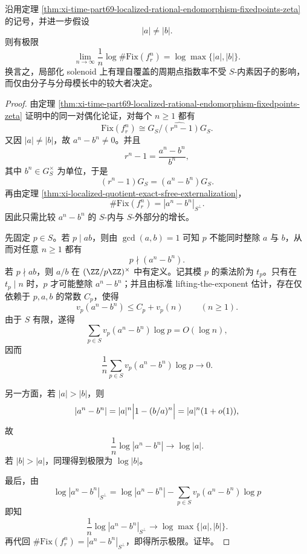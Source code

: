 \begin{theorem}[局部化有理自覆盖的周期点指数率只由分子分母的最大模控制]\label{thm:xi-time-part69-localized-rational-endomorphism-growth-rate}
沿用定理 \ref{thm:xi-time-part69-localized-rational-endomorphism-fixedpoints-zeta} 的记号，并进一步假设
\[
|a|\neq |b|.
\]
则有极限
\[
\lim_{n\to\infty}\frac{1}{n}\log \#\mathrm{Fix}(f_r^n)
=
\log\max\{|a|,|b|\}.
\]
换言之，局部化 solenoid 上有理自覆盖的周期点指数率不受 \(S\)-内素因子的影响，而仅由分子与分母模长中的较大者决定。
\end{theorem}
\begin{proof}
由定理 \ref{thm:xi-time-part69-localized-rational-endomorphism-fixedpoints-zeta} 证明中的同一对偶化论证，对每个 \(n\ge 1\) 都有
\[
\mathrm{Fix}(f_r^n)\cong \widehat{G_S/(r^n-1)G_S}.
\]
又因 \(|a|\neq |b|\)，故 \(a^n-b^n\neq 0\)。并且
\[
r^n-1=\frac{a^n-b^n}{b^n},
\]
其中 \(b^n\in G_S^\times\) 为单位，于是
\[
(r^n-1)G_S=(a^n-b^n)G_S.
\]
再由定理 \ref{thm:xi-localized-quotient-exact-sfree-externalization}，
\[
\#\mathrm{Fix}(f_r^n)=|a^n-b^n|_{S^\perp}.
\]
因此只需比较 \(a^n-b^n\) 的 \(S\)-内与 \(S\)-外部分的增长。

先固定 \(p\in S\)。若 \(p\mid ab\)，则由 \(\gcd(a,b)=1\) 可知 \(p\) 不能同时整除 \(a\) 与 \(b\)，从而对任意 \(n\ge 1\) 都有
\[
p\nmid (a^n-b^n).
\]
若 \(p\nmid ab\)，则 \(a/b\) 在 \((\ZZ/p\ZZ)^\times\) 中有定义。记其模 \(p\) 的乘法阶为 \(t_p\)。只有在 \(t_p\mid n\) 时，\(p\) 才可能整除 \(a^n-b^n\)；并且由标准 lifting-the-exponent 估计，存在仅依赖于 \(p,a,b\) 的常数 \(C_p\)，使得
\[
v_p(a^n-b^n)\le C_p+v_p(n)
\qquad(n\ge 1).
\]
由于 \(S\) 有限，遂得
\[
\sum_{p\in S}v_p(a^n-b^n)\log p=O(\log n),
\]
因而
\[
\frac{1}{n}\sum_{p\in S}v_p(a^n-b^n)\log p\longrightarrow 0.
\]

另一方面，若 \(|a|>|b|\)，则
\[
|a^n-b^n|
=
|a|^n\Bigl|1-(b/a)^n\Bigr|
=
|a|^n(1+o(1)),
\]
故
\[
\frac{1}{n}\log |a^n-b^n|\longrightarrow \log|a|.
\]
若 \(|b|>|a|\)，同理得到极限为 \(\log|b|\)。

最后，由
\[
\log |a^n-b^n|_{S^\perp}
=
\log |a^n-b^n|
-\sum_{p\in S}v_p(a^n-b^n)\log p
\]
即知
\[
\frac{1}{n}\log |a^n-b^n|_{S^\perp}
\longrightarrow
\log\max\{|a|,|b|\}.
\]
再代回
\(\#\mathrm{Fix}(f_r^n)=|a^n-b^n|_{S^\perp}\)，即得所示极限。证毕。
\end{proof}

